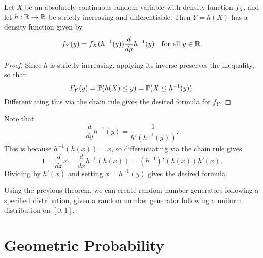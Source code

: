\begin{theorem}
  Let $X$ be an absolutely continuous random
  variable with density function $f_X$, and let
  $h : \mathbb{R} \to \mathbb{R}$ be strictly increasing
  and differentiable. Then $Y = h(X)$ has
  a density function given by
  \[
    f_Y(y) = f_X(h^{-1}(y)) \frac{d}{dy} h^{-1}(y)
    \quad \text{for all $y \in \mathbb{R}$}.
  \]
\end{theorem}

\begin{proof}
  Since $h$ is strictly increasing, applying its
  inverse preserves the inequality, so that
  \[
    F_Y(y) = \mathbb{P}(h(X) \le y)
    = \mathbb{P}(X \le h^{-1}(y)).
  \]
  Differentiating this via the chain rule gives
  the desired formula for $f_Y$.
\end{proof}

\begin{remark}
  Note that
  \[
    \frac{d}{dy} h^{-1}(y)
    = \frac{1}{h'(h^{-1}(y))}.
  \]
  This is because $h^{-1}(h(x)) = x$, so differentiating
  via the chain rule gives
  \[
    1 = \frac{d}{dx} x = \frac{d}{dx} h^{-1}(h(x))
    = (h^{-1})'(h(x)) h'(x).
  \]
  Dividing by $h'(x)$ and setting $x = h^{-1}(y)$ gives
  the desired formula.
\end{remark}

\begin{remark}
  Using the previous theorem, we can create
  random number generators following a specified
  distribution, given a random number generator
  following a uniform distribution on
  $[0, 1]$.
\end{remark}

\section{Geometric Probability}

